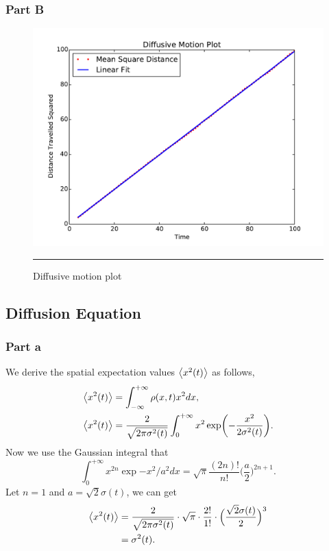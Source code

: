 \documentclass[notitlepage,aps,prd,nofootinbib]{revtex4-1}
\begin{document}
\newpage

\subsubsection{Part B}
\begin{figure}[!htbc]
  \centering
  \includegraphics[width=.6\textwidth]{../output/plots_for_paper/problem_1/Diffusion_Plot.pdf}
  	{\par\nobreak\rule[9pt]{35em}{0.5pt}\vspace{-5mm}}
	\caption{Diffusive motion plot}
	\label{fig:1_b}
\end{figure}

\subsection{Diffusion Equation}
\label{subsec:results_2}
\subsubsection{Part a}
\label{subsubsec:results_2_a}
We derive the spatial expectation values $\expval{x^{2}(t)}$ as follows,
\begin{align}
	\expval{x^{2}(t)} &= \int_{-\infty}^{+\infty} \rho(x, t) x^{2} dx, \\
	\expval{x^{2}(t)} &= \frac{2}{\sqrt{2\pi\sigma^{2}(t)}} \int_{0}^{+\infty} x^{2} \exp(-\frac{x^{2}}{2\sigma^{2}(t)}).
\end{align}
Now we use the Gaussian integral that
\begin{equation}
	\int_{0}^{+\infty} x^{2n} \exp{-x^{2}/a^{2}} dx = \sqrt{\pi} \frac{(2n)!}{n!}\Big( \frac{a}{2} \Big)^{2n+1}.
\end{equation}
Let $n = 1$ and $a = \sqrt{2}\sigma(t)$, we can get
\begin{equation}
	\begin{split}
		\expval{x^{2}(t)} &= \frac{2}{\sqrt{2\pi\sigma^{2}(t)}} \cdot \sqrt{\pi}\cdot \frac{2!}{1!} \cdot \Big( \frac{\sqrt{2}\sigma(t)}{2} \Big)^{3} \\
		&= \sigma^{2}(t).
	\end{split} 
\end{equation}
\end{document}
